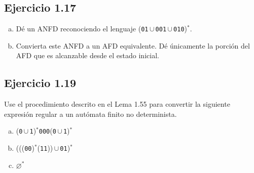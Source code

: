 \documentclass{article}
\begin{document}
\subsection*{Ejercicio 1.17}
\begin{enumerate}[a.]
    \item Dé un ANFD reconociendo el lenguaje (\texttt{01}\,$\cup$\,\texttt{001}\,$\cup$\,\texttt{010})$^*$.
    
    \item Convierta este ANFD a un AFD equivalente. Dé únicamente la porción del AFD que es alcanzable desde el estado inicial.
\end{enumerate}

\subsection*{Ejercicio 1.19}
Use el procedimiento descrito en el Lema 1.55 para convertir la siguiente expresión regular a un autómata finito no determinista.
\begin{enumerate}[a.]
    \item (\texttt{0}\,$\cup$\,\texttt{1})$^*$\texttt{000}(\texttt{0}\,$\cup$\,\texttt{1})$^*$
    
    \item (((\texttt{00})$^*$(\texttt{11}))\,$\cup$\,\texttt{01})$^*$
    
    \item $\varnothing^*$
\end{enumerate}
\end{document}
